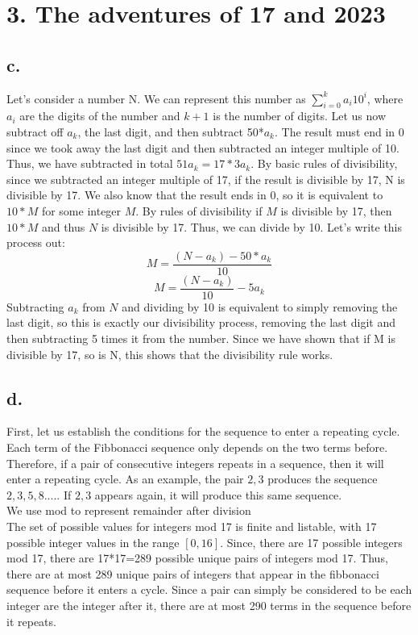 \documentclass{article}
\begin{document}
\section*{3. The adventures of 17 and 2023}
\subsection*{c.}
Let's consider a number N. We can represent this number as $\sum_{i=0}^{k}a_i10^i$, where $a_i$ are the digits of the number and $k+1$ is the number of digits. Let us now subtract off $a_k$, the last digit, and then subtract 50*$a_k$. The result must end in 0 since we took away the last digit and then subtracted an integer multiple of 10. Thus, we have subtracted in total $51a_k=17*3a_k$. By basic rules of divisibility, since we subtracted an integer multiple of 17, if the result is divisible by 17, N is divisible by 17. We also know that the result ends in 0, so it is equivalent to $10*M$ for some integer $M$. By rules of divisibility if $M$ is divisible by 17, then $10*M$ and thus $N$ is divisible by 17.  Thus, we can divide by 10. Let's write this process out:
$$M=\frac{(N-a_k)-50*a_k}{10}$$
$$M=\frac{(N-a_k)}{10}-5a_k$$
Subtracting $a_k$ from $N$ and dividing by 10 is equivalent to simply removing the last digit, so this is exactly our divisibility process, removing the last digit and then subtracting 5 times it from the number. Since we have shown that if M is divisible by 17, so is N, this shows that the divisibility rule works.
\subsection*{d. }
First, let us establish the conditions for the sequence to enter a repeating cycle. Each term of the Fibbonacci sequence only depends on the two terms before. Therefore, if a pair of consecutive integers repeats in a sequence, then it will enter a repeating cycle.  As an example, the pair $2, 3$ produces the sequence $2, 3, 5, 8....$. If $2, 3$ appears again, it will produce this same sequence. 
\\We use mod to represent remainder after division
\\The set of possible values for integers mod 17 is finite and listable, with 17 possible integer values in the range $[0, 16]$. Since, there are 17 possible integers mod 17, there are 17*17=289 possible unique pairs of integers mod 17. Thus, there are at most 289 unique pairs of integers that appear in the fibbonacci sequence before it enters a cycle. Since a pair can simply be considered to be each integer are the integer after it, there are at most 290 terms in the sequence before it repeats.
\end{document}
